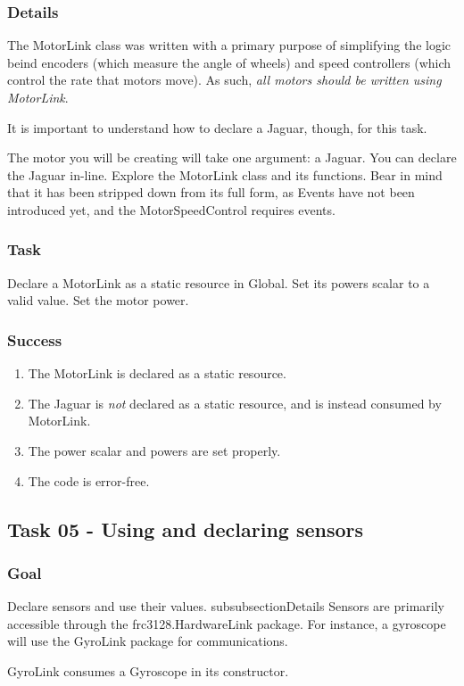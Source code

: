 \documentclass[a4paper]{article}
\begin{document}
\subsubsection{Details} The MotorLink class was written with a primary purpose of simplifying the logic beind encoders (which measure the angle of wheels) and speed controllers (which control the rate that motors move). As such, \textit{all motors should be written using MotorLink}. 

It is important to understand how to declare a Jaguar, though, for this task.

The motor you will be creating will take one argument: a Jaguar. You can declare the Jaguar in-line. Explore the MotorLink class and its functions. Bear in mind that it has been stripped down from its full form, as Events have not been introduced yet, and the MotorSpeedControl requires events.
\subsubsection{Task} Declare a MotorLink as a static resource in Global. Set its powers scalar to a valid value. Set the motor power.
\subsubsection{Success} \begin{enumerate}\item{The MotorLink is declared as a static resource.}\item{The Jaguar is \textit{not} declared as a static resource, and is instead consumed by MotorLink.}\item{The power scalar and powers are set properly.}\item{The code is error-free.}\end{enumerate}

\subsection{Task 05 - Using and declaring sensors}
\subsubsection{Goal} Declare sensors and use their values.
subsubsection{Details} Sensors are primarily accessible through the frc3128.HardwareLink package. For instance, a gyroscope will use the GyroLink package for communications. 

GyroLink consumes a Gyroscope in its constructor.
\end{document}
